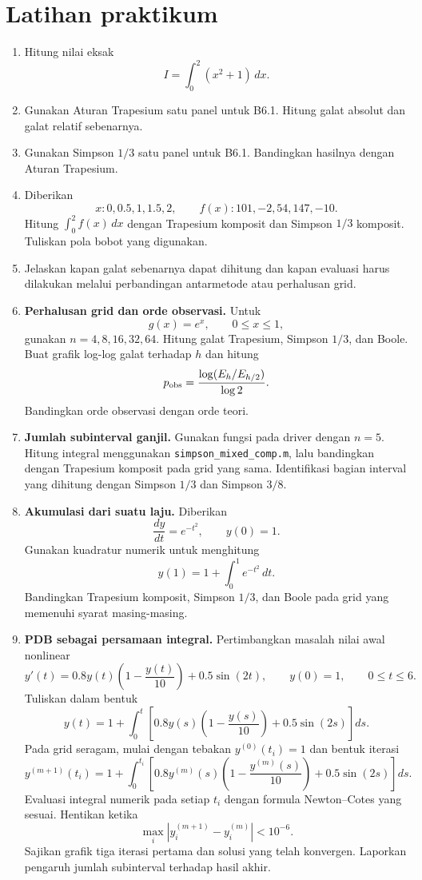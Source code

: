 \documentclass[book,english,noindex,lean,nobackpage,nocopyright,noupdate,nofiglist,notablist]{enacom}
\begin{document}
\section{Latihan praktikum}
\begin{enumerate}
\item[\textbf{B6.1 (L1)}] Hitung nilai eksak
\[
I=\int_0^2(x^2+1)\,dx.
\]

\item[\textbf{B6.2 (L2)}] Gunakan Aturan Trapesium satu panel untuk B6.1. Hitung galat absolut dan galat relatif sebenarnya.

\item[\textbf{B6.3 (L3)}] Gunakan Simpson $1/3$ satu panel untuk B6.1. Bandingkan hasilnya dengan Aturan Trapesium.

\item[\textbf{B6.4 (L4)}] Diberikan
\[
x:0,0.5,1,1.5,2,\qquad
f(x):101,-2,54,147,-10.
\]
Hitung $\int_0^2 f(x)\,dx$ dengan Trapesium komposit dan Simpson $1/3$ komposit. Tuliskan pola bobot yang digunakan.

\item[\textbf{B6.5 (L5)}] Jelaskan kapan galat sebenarnya dapat dihitung dan kapan evaluasi harus dilakukan melalui perbandingan antarmetode atau perhalusan grid.

\item \textbf{Perhalusan grid dan orde observasi.}
Untuk
\[
g(x)=e^x,\qquad 0\le x\le1,
\]
gunakan $n=4,8,16,32,64$. Hitung galat Trapesium, Simpson $1/3$, dan Boole. Buat grafik log-log galat terhadap $h$ dan hitung
\[
p_{\rm obs}
=
\frac{\log(E_h/E_{h/2})}{\log 2}.
\]
Bandingkan orde observasi dengan orde teori.

\item \textbf{Jumlah subinterval ganjil.}
Gunakan fungsi pada driver dengan $n=5$. Hitung integral menggunakan \texttt{simpson\_mixed\_comp.m}, lalu bandingkan dengan Trapesium komposit pada grid yang sama. Identifikasi bagian interval yang dihitung dengan Simpson $1/3$ dan Simpson $3/8$.

\item \textbf{Akumulasi dari suatu laju.}
Diberikan
\[
\frac{dy}{dt}=e^{-t^2},\qquad y(0)=1.
\]
Gunakan kuadratur numerik untuk menghitung
\[
y(1)=1+\int_0^1e^{-t^2}\,dt.
\]
Bandingkan Trapesium komposit, Simpson $1/3$, dan Boole pada grid yang memenuhi syarat masing-masing.

\item \textbf{PDB sebagai persamaan integral.}
Pertimbangkan masalah nilai awal nonlinear
\[
y'(t)
=
0.8y(t)\left(1-\frac{y(t)}{10}\right)
+0.5\sin(2t),
\qquad
y(0)=1,
\qquad 0\le t\le6.
\]
Tuliskan dalam bentuk
\[
y(t)
=
1+
\int_0^t
\left[
0.8y(s)\left(1-\frac{y(s)}{10}\right)
+0.5\sin(2s)
\right]ds.
\]
Pada grid seragam, mulai dengan tebakan $y^{(0)}(t_i)=1$ dan bentuk iterasi
\[
y^{(m+1)}(t_i)
=
1+
\int_0^{t_i}
\left[
0.8y^{(m)}(s)\left(1-\frac{y^{(m)}(s)}{10}\right)
+0.5\sin(2s)
\right]ds.
\]
Evaluasi integral numerik pada setiap $t_i$ dengan formula Newton--Cotes yang sesuai. Hentikan ketika
\[
\max_i
\left|
y_i^{(m+1)}-y_i^{(m)}
\right|
<10^{-6}.
\]
Sajikan grafik tiga iterasi pertama dan solusi yang telah konvergen. Laporkan pengaruh jumlah subinterval terhadap hasil akhir.
\end{enumerate}
\end{document}
